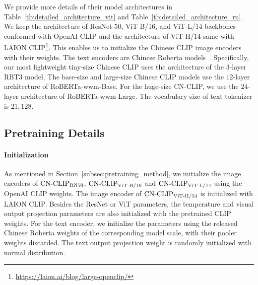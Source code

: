 
We provide more details of their model architectures in Table~\ref{tb:detailed_architecture_vit} and Table~\ref{tb:detailed_architecture_rn}. We keep the architecture of ResNet-50, ViT-B/16, and ViT-L/14 backbones conformed with OpenAI CLIP and the architecture of ViT-H/14 same with LAION CLIP\footnote{\url{https://laion.ai/blog/large-openclip/}}. 
This enables us to initialize the Chinese CLIP image encoders with their weights. 
The text encoders are Chinese Roberta models~\cite{wwm}. Specifically, our most lightweight tiny-size Chinese CLIP uses the architecture of the $3$-layer RBT3 model. The base-size and large-size Chinese CLIP models use the $12$-layer architecture of RoBERTa-wwm-Base. For the huge-size CN-CLIP, we use the $24$-layer architecture of RoBERTa-wwm-Large. The vocabulary size of text tokenizer is $21,128$.

\subsection{Pretraining Details}
\label{subsec:pretraining_details}

\paragraph{Initialization} As mentioned in Section~\ref{subsec:pretraining_method}, we initialize the image encoders of $\text{CN-CLIP}\rm_{RN50}$, $\text{CN-CLIP}\rm_{ViT\text{-}B/16}$ and $\text{CN-CLIP}\rm_{ViT\text{-}L/14}$ using the OpenAI CLIP weights. The image encoder of $\text{CN-CLIP}\rm_{ViT\text{-}H/14}$ is initialized with LAION CLIP. 
Besides the ResNet or ViT parameters, the temperature and visual output projection parameters are also initialized with the pretrained CLIP weights. 
For the text encoder, we initialize the parameters using the released Chinese Roberta weights of the corresponding model scale, with their pooler weights discarded. The text output projection weight is randomly initialized with normal distribution.




